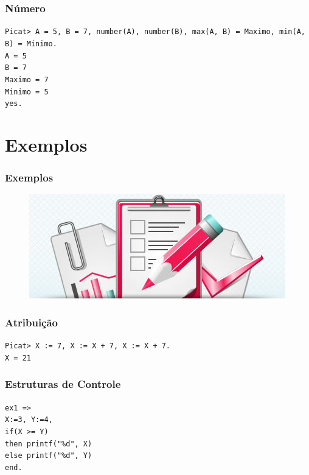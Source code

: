 \documentclass[10pt]{beamer}
\begin{document}
\begin{frame}
    \frametitle{Número}
    \texttt{Picat> A = 5, B = 7, number(A), number(B),
    max(A, B) = Maximo, min(A, B) = Minimo.}\\
  
    \texttt{A = 5}\\
    \texttt{B = 7}\\
    \texttt{Maximo = 7}\\
    \texttt{Minimo = 5}\\
    \texttt{yes.}
\end{frame}




\section{Exemplos}
\begin{frame}
    \frametitle{Exemplos}
    \begin{figure}[!ht]
    \centering
    \includegraphics[width=.6\textwidth]{figures/exercicio.jpg}
    \end{figure}
\end{frame}


\begin{frame}
    \frametitle{Atribuição}
     \texttt{Picat> X := 7, X := X + 7, X := X + 7.}\\
     \texttt{X = 21}
\end{frame}


\begin{frame}
    \frametitle{Estruturas de Controle}
     \texttt{ex1 =>}\\
     \texttt{X:=3, Y:=4,}\\
     \texttt{if(X >= Y)}\\
     \texttt{then printf("\%d", X)}\\
     \texttt{else printf("\%d", Y)}\\
     \texttt{end.}
\end{frame}
\end{document}
